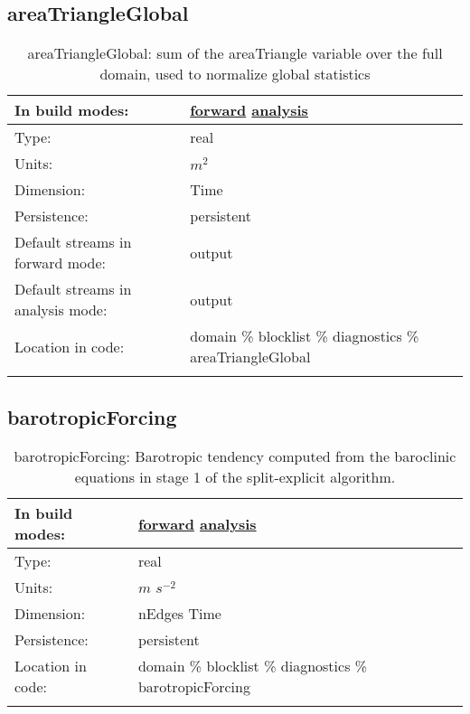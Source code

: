 \subsection[areaTriangleGlobal]{areaTriangleGlobal}
\label{subsec:var_sec_diagnostics_areaTriangleGlobal}
\begin{center}
\begin{longtable}{| p{2.0in} | p{4.0in} |}
        \hline 
        In build modes: & \hyperref[subsec:forward_var_tab_diagnostics]{forward} \hyperref[subsec:analysis_var_tab_diagnostics]{analysis} \\
        \hline 
        Type: & real \\
        \hline 
        Units: & $m^2$ \\
        \hline 
        Dimension: & Time \\
        \hline 
        Persistence: & persistent \\
        \hline 
		 Default streams in forward mode: &  output \\
        \hline 
		 Default streams in analysis mode: &  output \\
        \hline 
		 Location in code: & domain \% blocklist \% diagnostics \% areaTriangleGlobal \\
		 \hline 
    \caption{areaTriangleGlobal: sum of the areaTriangle variable over the full domain, used to normalize global statistics}
\end{longtable}
\end{center}
\subsection[barotropicForcing]{barotropicForcing}
\label{subsec:var_sec_diagnostics_barotropicForcing}
\begin{center}
\begin{longtable}{| p{2.0in} | p{4.0in} |}
        \hline 
        In build modes: & \hyperref[subsec:forward_var_tab_diagnostics]{forward} \hyperref[subsec:analysis_var_tab_diagnostics]{analysis} \\
        \hline 
        Type: & real \\
        \hline 
        Units: & $m$ $s^{-2}$ \\
        \hline 
        Dimension: & nEdges Time \\
        \hline 
        Persistence: & persistent \\
        \hline 
		 Location in code: & domain \% blocklist \% diagnostics \% barotropicForcing \\
		 \hline 
    \caption{barotropicForcing: Barotropic tendency computed from the baroclinic equations in stage 1 of the split-explicit algorithm.}
\end{longtable}
\end{center}
